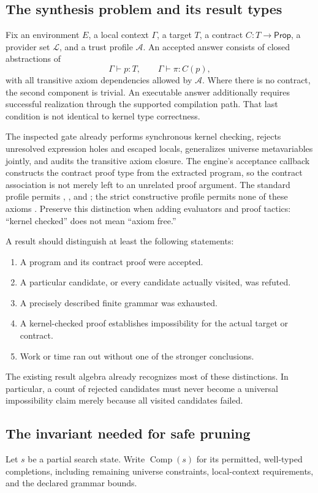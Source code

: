 \documentclass[11pt,a4paper]{article}
\newcommand{\code}[1]{\texttt{\detokenize{#1}}}
\newcommand{\Comp}{\operatorname{Comp}}
\newcommand{\Prop}{\ensuremath{\mathsf{Prop}}}
\theoremstyle{definition}
\theoremstyle{remark}
\begin{document}
\subsection{The synthesis problem and its result types}
Fix an environment $E$, a local context $\Gamma$, a target $T$, a contract
$C:T\to\Prop$, a provider set $\mathcal L$, and a trust profile $\mathcal A$.
An accepted answer consists of closed abstractions of
\[
 \Gamma\vdash p:T,
 \qquad \Gamma\vdash \pi:C(p),
\]
with all transitive axiom dependencies allowed by $\mathcal A$. Where there is
no contract, the second component is trivial. An executable answer additionally
requires successful realization through the supported compilation path. That
last condition is not identical to kernel type correctness.

The inspected gate already performs synchronous kernel checking, rejects
unresolved expression holes and escaped locals, generalizes universe
metavariables jointly, and audits the transitive axiom closure. The engine's
acceptance callback constructs the contract proof type from the extracted
program, so the contract association is not merely left to an unrelated proof
argument. The standard profile permits \code{propext}, \code{Quot.sound}, and
\code{Classical.choice}; the strict constructive profile permits none of these
axioms \cite{repo}. Preserve this distinction when adding evaluators and proof
tactics: ``kernel checked'' does not mean ``axiom free.''

A result should distinguish at least the following statements:
\begin{enumerate}
\item A program and its contract proof were accepted.
\item A particular candidate, or every candidate actually visited, was refuted.
\item A precisely described finite grammar was exhausted.
\item A kernel-checked proof establishes impossibility for the actual target or
contract.
\item Work or time ran out without one of the stronger conclusions.
\end{enumerate}
The existing result algebra already recognizes most of these distinctions. In
particular, a count of rejected candidates must never become a universal
impossibility claim merely because all visited candidates failed.

\subsection{The invariant needed for safe pruning}
Let $s$ be a partial search state. Write $\Comp(s)$ for its permitted,
well-typed completions, including remaining universe constraints, local-context
requirements, and the declared grammar bounds.
\end{document}
